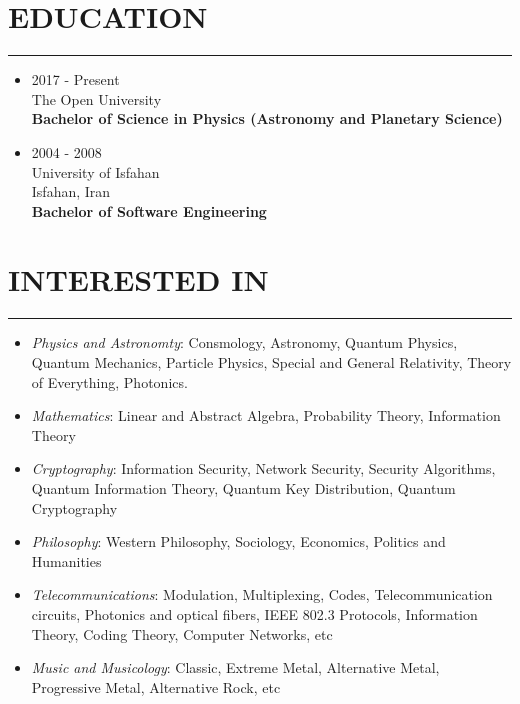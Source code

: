 \documentclass[10pt,a4paper]{article}
\begin{document}
\section{EDUCATION}
\noindent \rule {3.0cm}{0.4pt}
  \begin{itemize}
    \item \small {2017 - Present \\
                  The Open University \\
                  \textbf{Bachelor of Science in Physics (Astronomy and Planetary Science) }}
  \end{itemize}
  \begin{itemize}
    \item \small {2004 - 2008 \\
                  University of Isfahan \\
                  Isfahan, Iran \\
                  \textbf{Bachelor of Software Engineering}}
  \end{itemize}

\section{INTERESTED IN}
\noindent \rule {3.2cm}{0.4pt}
  \begin{itemize}
    \setlength{\rightskip}{2cm}
    \setlength\itemsep{0em}
    \item \small \textit{Physics and Astronomty}: Consmology, Astronomy, Quantum Physics, Quantum Mechanics, Particle Physics, Special and General Relativity, Theory of Everything, Photonics.
    \item \small \textit{Mathematics}: Linear and Abstract Algebra, Probability Theory, Information Theory
    \item \small \textit{Cryptography}: Information Security, Network Security, Security Algorithms, Quantum Information Theory, Quantum Key Distribution, Quantum Cryptography
    \item \small \textit{Philosophy}: Western Philosophy, Sociology, Economics, Politics and Humanities
    \item \small \textit{Telecommunications}: Modulation, Multiplexing, Codes, Telecommunication circuits, Photonics and optical fibers, IEEE 802.3 Protocols, Information Theory, Coding Theory, Computer Networks, etc
    \item \small \textit{Music and Musicology}: Classic, Extreme Metal, Alternative Metal, Progressive Metal, Alternative Rock, etc
  \end{itemize}
\end{document}
